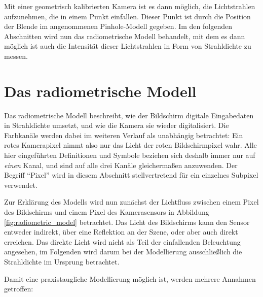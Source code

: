    Mit einer geometrisch kalibrierten Kamera ist es dann möglich, die  Lichtstrahlen aufzunehmen, die in einem Punkt einfallen.
   Dieser Punkt ist durch die Position der Blende im angenommenen Pinhole-Modell gegeben.
   Im den folgenden Abschnitten wird nun das radiometrische Modell behandelt, mit dem es dann möglich ist auch die Intensität dieser Lichtstrahlen in Form von Strahldichte zu messen.
    

 \section{Das radiometrische Modell} \label{radiometrisches_modell}
   
    Das radiometrische Modell beschreibt, wie der Bildschirm digitale Eingabedaten in Strahldichte umsetzt, und wie die Kamera sie wieder digitalisiert.
    Die Farbkanäle werden dabei im weiteren Verlauf als unabhängig betrachtet: Ein rotes Kamerapixel nimmt also nur das Licht der roten Bildschirmpixel wahr. 
    Alle hier eingeführten Definitionen und Symbole beziehen sich deshalb immer nur auf \emph{einen} Kanal, und sind auf alle drei Kanäle gleichermaßen anzuwenden.
    Der Begriff ``Pixel'' wird in diesem Abschnitt stellvertretend für ein einzelnes Subpixel verwendet.
 
    Zur Erklärung des Modells wird nun zunächst der Lichtfluss zwischen einem Pixel des Bildschirms und einem Pixel des Kamerasensors in Abbildung \ref{fig:radiometric_model} betrachtet.
    Das Licht des Bildschirms kann den Sensor entweder indirekt, über eine Reflektion an der Szene, oder aber auch direkt erreichen.
    Das direkte Licht wird nicht als Teil der einfallenden Beleuchtung angesehen,  im Folgenden wird darum bei der Modellierung ausschließlich die Strahldichte im Ursprung betrachtet.

   Damit eine praxistaugliche Modellierung möglich ist, werden mehrere Annahmen getroffen:

